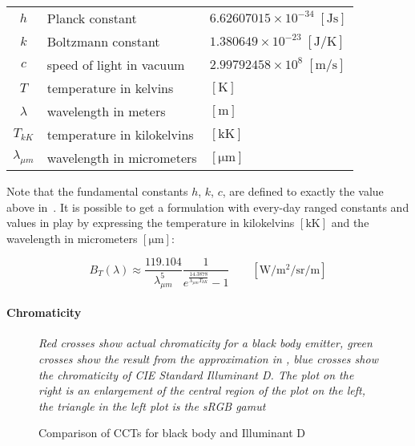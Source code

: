 \begin{center}
\begin{tabular}{c l l}
$h$                & Planck constant            & $6.62607015\times 10^{-34} \;[\unit{\joule\second}]$  \\
$k$                & Boltzmann constant         & $1.380649\times 10^{-23} \;[\unit{\joule\per\kelvin}]$  \\
$c$                & speed of light in vacuum   & $2.99792458\times 10^{8} \;[\unit{\meter\per\second}]$ \\
$T$                & temperature in kelvins     & $[\unit{\kelvin}]$    \\
$\lambda$          & wavelength in meters       & $[\unit{\meter}]$    \\
$T_{kK}$           & temperature in kilokelvins & $[\unit{\kilo\kelvin}]$ \\
$\lambda_{\mu m}$  & wavelength in micrometers  & $[\unit{\micro\meter}]$ \\
\end{tabular}
\end{center}
Note that the fundamental constants $h$, $k$, $c$, are defined to exactly the value above in~\cite{bipm:si.2019}.
It is possible to get a formulation with every-day ranged constants and values in play by expressing the temperature in kilokelvins $[\unit{\kilo\kelvin}]$ and the wavelength in micrometers $[\unit{\micro\meter}]$:

\begin{equation}
B_T(\lambda) \approx \frac{119.104}{\lambda_{\mu m}^5} \frac
1{e^{\frac{14.3878}{\lambda_{\mu m} T_{kK}}}-1}
\qquad \left[\unit{\watt\per\square\meter\per\steradian\per\meter}\right]
\end{equation}

\paragraph{Chromaticity}

\begin{figure}
{
\centering
\begin{minipage}{.4\linewidth}
\end{minipage}\qquad\qquad
\begin{minipage}{.4\linewidth}
\end{minipage}

\caption{Comparison of CCTs for black body and Illuminant D}
\label{fig:blackbodychroma}
}
\vskip 1mm
{\footnotesize\it Red crosses show actual chromaticity for a black body
emitter, green crosses show the result from the approximation in
\cite{kang02}, blue crosses show the chromaticity of CIE Standard
Illuminant D. The plot on the right is an enlargement of the
central region of the plot on the left, the triangle in the left plot
is the sRGB gamut}
\end{figure}

